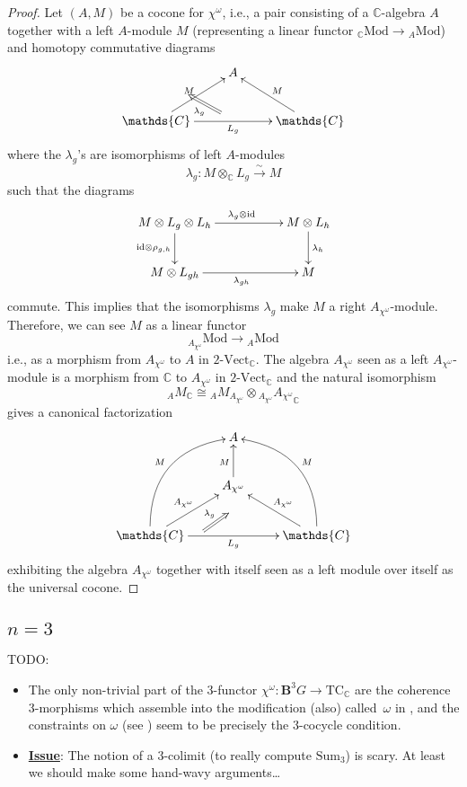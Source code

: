 \documentclass[12pt]{scrartcl}
\newcommand{\boldB}{\boldsymbol{B}}
\newcommand{\C}{\mathds{C}}
\theoremstyle{definition}
\numberwithin{equation}{section}
\numberwithin{definition}{section}
\numberwithin{figure}{section}
\begin{document}
\begin{proof}
Let $(A,M)$ be a cocone for $\chi^\omega$, i.e., a pair consisting of a $\C$-algebra $A$ together with a left $A$-module $M$ (representing a linear functor ${}_\C\mathrm{Mod}\to {}_A\mathrm{Mod}$) and homotopy commutative diagrams
\[
\xymatrix{
&A\\
\C\ar[rr]_{L_g}\ar[ur]^{M}&&\C\ar[lu]_M
\ar@{=>}^{\lambda_g}(18,-11);(9,-6)}
\]
where the $\lambda_g$'s are isomorphisms of left $A$-modules
\[
\lambda_g\colon  M\otimes_\C L_g\xrightarrow{\sim} M
\]
such that the diagrams
\[
\xymatrix{
M\otimes L_g\otimes L_h\ar[rr]^{\lambda_{g}\otimes \mathrm{id}}\ar[d]_{\mathrm{id}\otimes \rho_{g,h}}&& M\otimes L_h\ar[d]^{\lambda_h}\\
M\otimes L_{gh}\ar[rr]_{\lambda_{gh}} &&M
}
\]
commute. This implies that the isomorphisms $\lambda_g$ make $M$ a right $A_{\chi^\omega}$-module. Therefore, we can see $M$ as a linear functor 
\[
{}_{A_{\chi^\omega}}\mathrm{Mod}\to {}_A\mathrm{Mod}
\]
i.e., as a morphism from $A_{\chi^\omega}$ to $A$ in $2\text{-}\mathrm{Vect}_\C$. The algebra $A_{\chi^\omega}$ seen as a left $A_{\chi^\omega}$-module is a morphism from $\C$ to $A_{\chi^\omega}$ in $2\text{-}\mathrm{Vect}_\C$ and the natural isomorphism
\[
{}_AM_\C\cong {}_AM_{A_{\chi^\omega}}\otimes {}_{A_{\chi^\omega}}{A_{\chi^\omega}}_\C
\]
gives a canonical factorization
\[
\xymatrix{
&A\\
&A_{\chi^\omega}\ar[u]^{M}\\
\C\ar[rr]_{L_g}\ar[ur]^{A_{\chi^\omega}}\ar@/^2pc/[ruu]^{M}&&\C\ar[lu]_{A_{\chi^\omega}}\ar@/_2pc/[luu]_{M}
\ar@{=>}^{\lambda_g}(15,-26);(22,-21)}
\]
exhibiting the algebra $A_{\chi^\omega}$ together with itself seen as a left module over itself as the universal cocone. 
\end{proof}


\subsection{$n=3$}

TODO:
\begin{itemize}
\item
The only non-trivial part of the 3-functor $\chi^\omega \colon \boldB^3 G \to \text{TC}_\C$ are the coherence 3-morphisms which assemble into the modification (also) called~$\omega$ in \cite[Def.\,A.4.3]{GregorDiss}, and the constraints on $\omega$ (see \cite[Page~219]{GregorDiss}) seem to be precisely the 3-cocycle condition. 
\item
\underline{\textbf{Issue}}: The notion of a 3-colimit (to really compute $\text{Sum}_3$) is scary. 
At least we should make some hand-wavy arguments\dots
\end{itemize}
\end{document}
